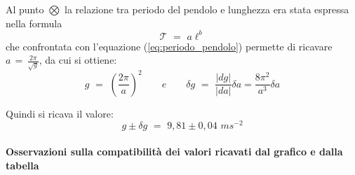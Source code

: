 Al punto $\bigotimes$ la relazione tra periodo del pendolo e lunghezza era stata espressa nella formula
\begin{equation*}
\mathcal{T} \,\, = \,\, a\ell^b
\end{equation*}
che confrontata con l'equazione (\ref{eq:periodo_pendolo}) permette di ricavare $a \, = \, \frac{2 \pi}{\sqrt{g}}$, da cui si ottiene:
\begin{equation}
g \,\, = \,\, \left( \frac{2 \pi}{a}\right)^2 \quad\quad e \quad\quad \delta g \,\, = \,\, \frac{\vert dg \vert}{\vert da\vert} \delta a = \frac{8 \pi^2}{a^3} \delta a
\end{equation}

Quindi si ricava il valore:
\begin{equation}
g \pm \delta g \,\, = \,\, 9,81 \pm 0,04 \,\, ms^{-2}
\end{equation}

\paragraph{Osservazioni sulla compatibilità dei valori ricavati dal grafico e dalla tabella}


